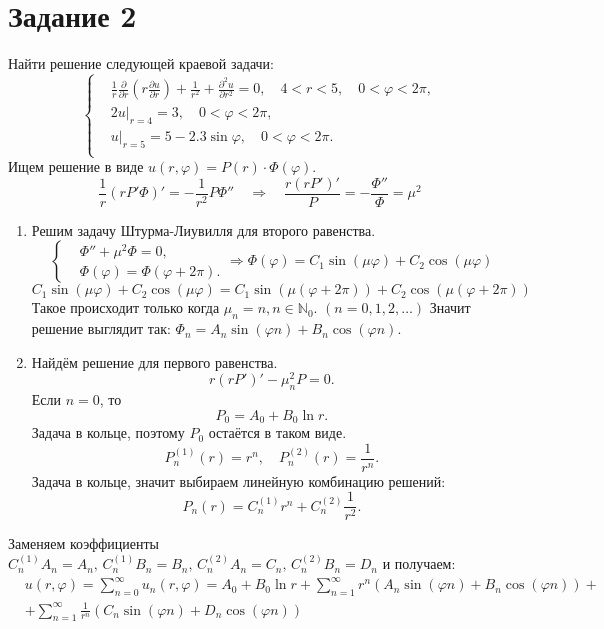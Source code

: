 \section*{Задание 2}
Найти решение следующей краевой задачи: 
\[
    \left\{\begin{split}
        & \frac{1}{r} \frac{\partial}{\partial r} \left( r \frac{\partial u}{\partial r} \right) + \frac{1}{r^2} + \frac{\partial^2 u}{\partial r^2} = 0, \quad 4 < r < 5, \quad 0 < \varphi < 2\pi, \\
        & 2u|_{r=4} = 3, \quad 0 < \varphi < 2\pi, \\
        & u|_{r=5} = 5 - 2.3 \sin \varphi, \quad 0 < \varphi < 2\pi. \\
    \end{split} \right.
\]
Ищем решение в виде \( u(r, \varphi) = P(r) \cdot \Phi(\varphi) \).
\[
    \frac{1}{r} \left( r P' \Phi \right)' = - \frac{1}{r^2} P \Phi''
    \quad \Rightarrow \quad
    \frac{r\left(r P'\right)'}{P} = - \frac{\Phi''}{\Phi} = \mu^2
\]
\begin{enumerate}
    \item Решим задачу Штурма-Лиувилля для второго равенства.
    \[
        \left\{\begin{split}
            & \Phi'' + \mu^2 \Phi = 0, \\
            & \Phi(\varphi) = \Phi(\varphi + 2\pi).
        \end{split}\right.
        \Rightarrow
        \Phi(\varphi) = C_1 \sin (\mu \varphi) + C_2 \cos (\mu \varphi) 
    \]
    \[
        C_1 \sin (\mu \varphi) + C_2 \cos (\mu \varphi) = C_1 \sin \left(\mu (\varphi+2\pi)\right) + C_2 \cos \left(\mu (\varphi+2\pi)\right)
    \]
    Такое происходит только когда \( \mu_n = n, n \in \mathbb{N}_0 \). \( (n = 0,1,2,\dots) \) Значит решение выглядит так:
    \(
        \Phi_n = A_n \sin (\varphi n) + B_n \cos (\varphi n)
    \).
    \item Найдём решение для первого равенства.
    \[
        r\left( r P' \right)' - \mu_n^2 P = 0.
    \]
    Если \( n = 0 \), то 
    \[
        P_0 = A_0 + B_0 \ln r.
    \]
    Задача в кольце, поэтому \(P_0\) остаётся в таком виде.
    \[
        P_n^{(1)}(r) = r^n, \quad P_n^{(2)}(r) = \frac{1}{r^n}.
    \]
    Задача в кольце, значит выбираем линейную комбинацию решений:
    \[ P_n(r) = C_n^{(1)} r^n + C_n^{(2)} \frac{1}{r^2}. \]
\end{enumerate}

Заменяем коэффициенты \( C_n^{(1)} A_n = A_n, \, C_n^{(1)} B_n = B_n, \, C_n^{(2)} A_n = C_n, \, C_n^{(2)} B_n = D_n \) и получаем:
\[
    \begin{split}
        & u(r, \varphi) = \sum_{n=0}^{\infty} u_n(r, \varphi) = A_0 + B_0 \ln r + \sum_{n=1}^{\infty} r^n \left( A_n \sin (\varphi n) + B_n \cos (\varphi n) \right) + \\
        & + \sum_{n=1}^{\infty} \frac{1}{r^n} \left( C_n \sin (\varphi n) + D_n \cos (\varphi n) \right)
    \end{split}
\]

